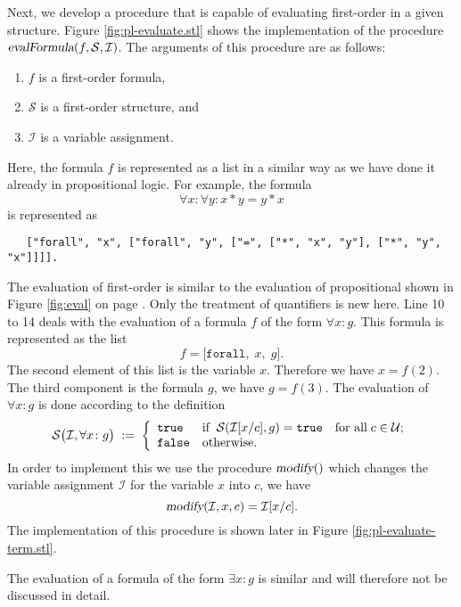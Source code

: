 Next, we develop a procedure that is capable of evaluating first-order \formulae in a given structure.
Figure \ref{fig:pl-evaluate.stl} shows the implementation of the procedure 
$\textsl{evalFormula}(f, \mathcal{S}, \mathcal{I})$.  The arguments of this procedure are as follows:
\begin{enumerate}
\item $f$ is a first-order formula, 
\item $\mathcal{S}$ is a first-order structure, and
\item $\mathcal{I}$ is a variable assignment.
\end{enumerate}
Here, the formula $f$ is represented as a list in a similar way as we have done it already in
propositional logic.
For example, the formula
\[ \forall x: \forall y: x * y = y * x \]
is represented as
\begin{verbatim}
   ["forall", "x", ["forall", "y", ["=", ["*", "x", "y"], ["*", "y", "x"]]]].
\end{verbatim}
The evaluation of first-order \formulae is similar to the evaluation of propositional
\formulae shown in Figure  \ref{fig:eval} on page \pageref{fig:eval}.
Only the treatment of quantifiers is new here.
Line 10 to 14 deals with the evaluation of a formula $f$ of the form $\forall x \colon g$.
This formula is represented as the list  
\[ f = \texttt{[} \texttt{forall},\; x,\; g \texttt{]}.  \]
The second element of this list is the variable $x$.  Therefore we have
$x = f(2)$.  The third component is the formula $g$, we have $g = f(3)$.  The evaluation
of  $\forall x\colon g$ is done according to the definition 
\[\mathcal{S}\bigl(\mathcal{I}, \forall x\colon g\bigr) \;:=\; \left\{
      \begin{array}{ll}
         \mathtt{true}  & \mbox{if}\;\; \mathcal{S}(\mathcal{I}[x/c], g) = \mathtt{true}\quad
         \mbox{for all}\; c\in \mathcal{U}; \\
         \mathtt{false} & \mbox{otherwise}.
      \end{array}
      \right.
\]
In order to implement this we use the procedure  $\textsl{modify}()$ which changes the
variable assignment $\mathcal{I}$ for the variable $x$ into $c$, we have
\[ \textsl{modify}(\mathcal{I},x,c) = \mathcal{I}[x/c]. \]
The implementation of this procedure is shown later in Figure  \ref{fig:pl-evaluate-term.stl}.

The evaluation of a formula of the form  $\exists x\colon g$ is similar and will therefore
not be discussed in detail.


